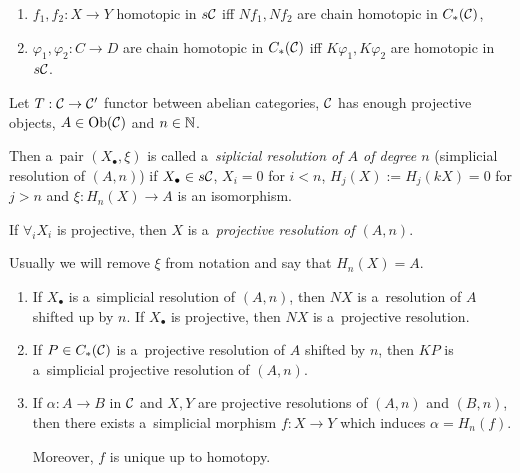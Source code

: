     \begin{theorem}
        \begin{enumerate}
            \item $f_1, f_2:X \to Y$ homotopic in $s\mathcal{C}$
            iff $Nf_1, Nf_2$ are chain homotopic in $C_\ast(\mathcal{C})$,
            \item $\varphi_1, \varphi_2:C \to D$ 
            are chain homotopic in $C_\ast(\mathcal{C})$
            iff $K\varphi_1, K\varphi_2$ are homotopic in $s\mathcal{C}$.
        \end{enumerate}
    \end{theorem}
    
    \begin{definition}
        Let $T:\mathcal{C} \to \mathcal{C}'$ functor between abelian categories,
        $\mathcal{C}$ has enough projective objects, 
        $A \in \operatorname{Ob}(\mathcal{C})$ and $n \in {\mathbb{N}}$.
        
        Then a~pair $(X_\bullet, \xi)$ is called 
        a~{\em siplicial resolution of $A$ of degree $n$}
        (simplicial resolution of $(A,n)$)
        if $X_\bullet \in s\mathcal{C}$, $X_i = 0$ for $i<n$,
        $H_j(X) := H_j(kX) = 0$ for $j>n$
        and $\xi:H_n(X) \to A$ is an isomorphism.
        
        If $\forall_i X_i$ is projective, then $X$
        is a~{\em projective resolution of $(A,n)$}.
        
        Usually we will remove $\xi$ from notation 
        and say that $H_n(X) = A$.
    \end{definition}
    
    \begin{remark}
        \begin{enumerate}
            \item If $X_\bullet$ is a~simplicial resolution of $(A,n)$,
            then $NX$ is a~resolution of $A$ shifted up by $n$.
            If $X_\bullet$ is projective, then $NX$ 
            is a~projective resolution.
            \item If $P \in C_\ast(\mathcal{C})$ is a~projective resolution of 
            $A$ shifted by $n$, then $KP$ is a~simplicial
            projective resolution of $(A,n)$.
            \item If $\alpha:A \to B$ in $\mathcal{C}$ and $X,Y$ are projective
            resolutions of $(A,n)$ and $(B,n)$, then
            there exists a~simplicial morphism
            $f:X \to Y$ which induces $\alpha = H_n(f)$.
            
            Moreover, $f$ is unique up to homotopy.
        \end{enumerate}
    \end{remark}
    
